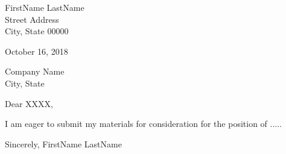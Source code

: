 \documentclass[11pt,a4paper,sans]{letter} %
\begin{document}
FirstName LastName \\ %
Street Address \\ %
City, State 00000 %

October 16, 2018 %

Company Name\\ %
City, State %

Dear XXXX, %

\bigbreak %


I am eager to submit my materials for consideration for the position of .....
\blindtext %

\bigbreak %

\blindtext %

\bigbreak %

\blindtext %



\bigbreak %
Sincerely,
\bigbreak %
FirstName LastName %
\end{document}
